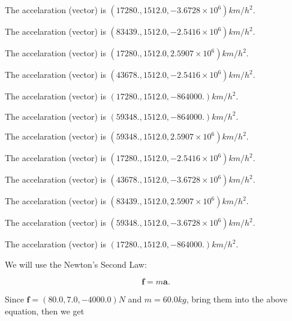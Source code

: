 \documentclass[12pt]{article}
\begin{document}
 
The accelaration (vector) is
$(
17280.,
1512.0 ,
-3.6728 \times 10^{6}
)km/h^2.
$
 
 
The accelaration (vector) is
$(
83439.,
1512.0 ,
-2.5416 \times 10^{6}
)km/h^2.
$
 
 
The accelaration (vector) is
$(
17280.,
1512.0 ,
2.5907 \times 10^{6}
)km/h^2.
$
 
 
The accelaration (vector) is
$(
43678.,
1512.0 ,
-2.5416 \times 10^{6}
)km/h^2.
$
 
 
The accelaration (vector) is
$(
17280.,
1512.0 ,
-864000.
)km/h^2.
$
 
 
The accelaration (vector) is
$(
59348.,
1512.0 ,
-864000.
)km/h^2.
$
 
 
The accelaration (vector) is
$(
59348.,
1512.0 ,
2.5907 \times 10^{6}
)km/h^2.
$
 
 
The accelaration (vector) is
$(
17280.,
1512.0 ,
-2.5416 \times 10^{6}
)km/h^2.
$
 
 
The accelaration (vector) is
$(
43678.,
1512.0 ,
-3.6728 \times 10^{6}
)km/h^2.
$
 
 
The accelaration (vector) is
$(
83439.,
1512.0 ,
2.5907 \times 10^{6}
)km/h^2.
$
 
 
The accelaration (vector) is
$(
59348.,
1512.0 ,
-3.6728 \times 10^{6}
)km/h^2.
$
 
 
\noindent{}
 
 
The accelaration (vector) is
$(
17280.,
1512.0 ,
-864000.
)km/h^2.
$
 
 
\noindent{}
 
 
 
 
 
 
\noindent{}
 
 

We will use the Newton's Second Law:
 
\[
\mathbf{f}=m\mathbf{a}.
\]
 
Since $\mathbf{f}=( %
80.0,  %
7.0,  %
-4000.0 )N$
and $m= %
60.0 kg$, bring them into the above equation, then we get
 
\end{document}
